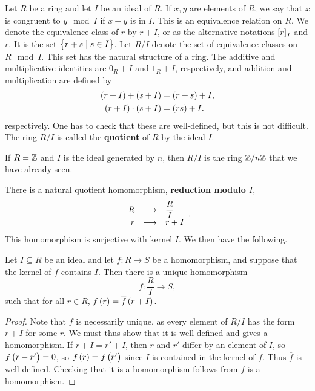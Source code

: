 Let $ R $ be a ring and let $ I $ be an ideal of $ R $. If $ x, y $ are elements of $ R $, we say that $ x $ is congruent to $ y \mod I $ if $ x - y $ is in $ I $. This is an equivalence relation on $ R $. We denote the equivalence class of $ r $ by $ r + I $, or as the alternative notations $ \sbr{r}_I $ and $ \overline{r} $. It is the set $ \cbr{r + s \mid s \in I} $. Let $ R / I $ denote the set of equivalence classes on $ R \mod I $. This set has the natural structure of a ring. The additive and multiplicative identities are $ 0_R + I $ and $ 1_R + I $, respectively, and addition and multiplication are defined by
\begin{align*}
\br{r + I} + \br{s + I} & = \br{r + s} + I, \\
\br{r + I} \cdot \br{s + I} & = \br{rs} + I.
\end{align*}
respectively. One has to check that these are well-defined, but this is not difficult. The ring $ R / I $ is called the \textbf{quotient} of $ R $ by the ideal $ I $.

\pagebreak

\begin{example*}
If $ R = \mathbb{Z} $ and $ I $ is the ideal generated by $ n $, then $ R / I $ is the ring $ \mathbb{Z} / n\mathbb{Z} $ that we have already seen.
\end{example*}

There is a natural quotient homomorphism, \textbf{reduction modulo $ I $},
$$ \function{R}{\dfrac{R}{I}}{r}{r + I}. $$
This homomorphism is surjective with kernel $ I $. We then have the following.

\begin{proposition}
\label{prop:2.5.1}
Let $ I \subseteq R $ be an ideal and let $ f : R \to S $ be a homomorphism, and suppose that the kernel of $ f $ contains $ I $. Then there is a unique homomorphism
$$ \overline{f} : \dfrac{R}{I} \to S, $$
such that for all $ r \in R $, $ f\br{r} = \overline{f}\br{r + I} $.
\end{proposition}

\begin{proof}
Note that $ \overline{f} $ is necessarily unique, as every element of $ R / I $ has the form $ r + I $ for some $ r $. We must thus show that it is well-defined and gives a homomorphism. If $ r + I = r' + I $, then $ r $ and $ r' $ differ by an element of $ I $, so $ f\br{r - r'} = 0 $, so $ f\br{r} = f\br{r'} $ since $ I $ is contained in the kernel of $ f $. Thus $ \overline{f} $ is well-defined. Checking that it is a homomorphism follows from $ f $ is a homomorphism.
\end{proof}

